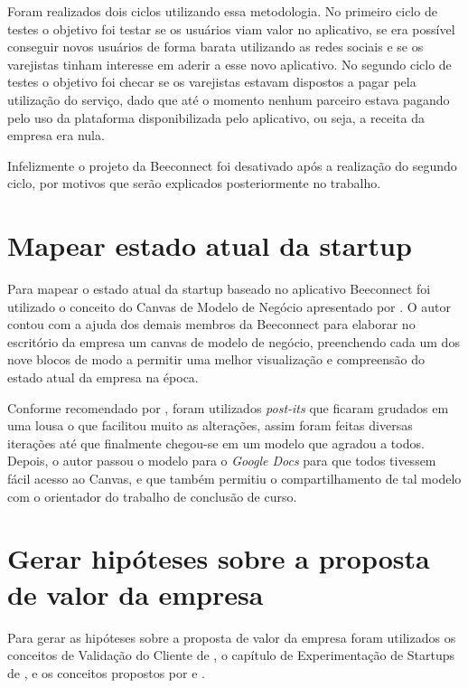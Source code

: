 Foram realizados dois ciclos utilizando essa metodologia. No primeiro ciclo de testes o objetivo foi testar se os usuários viam valor no aplicativo, se era possível conseguir novos usuários de forma barata utilizando as redes sociais e se os varejistas tinham interesse em aderir a esse novo aplicativo. No segundo ciclo de testes o objetivo foi checar se os varejistas estavam dispostos a pagar pela utilização do serviço, dado que até o momento nenhum parceiro estava pagando pelo uso da plataforma disponibilizada pelo aplicativo, ou seja, a receita da empresa era nula.

Infelizmente o projeto da Beeconnect foi desativado após a realização do segundo ciclo, por motivos que serão explicados posteriormente no trabalho.

\section{Mapear estado atual da startup}
\label{cha:mapear_estado}
Para mapear o estado atual da startup baseado no aplicativo Beeconnect foi utilizado o conceito do Canvas de Modelo de Negócio apresentado por .
O autor contou com a ajuda dos demais membros da Beeconnect para elaborar no escritório da empresa um canvas de modelo de negócio, preenchendo cada um dos nove blocos de modo a permitir uma melhor visualização e compreensão do estado atual da empresa na época. 

Conforme recomendado por  , foram utilizados \textit{post-its} que ficaram grudados em uma lousa o que facilitou muito as alterações, assim foram feitas diversas iterações até que finalmente chegou-se em um modelo que agradou a todos. Depois, o autor passou o modelo para o \textit{Google Docs} para que todos tivessem fácil acesso ao Canvas, e que também permitiu o compartilhamento de tal modelo com o orientador do trabalho de conclusão de curso.

\section{Gerar hipóteses sobre a proposta de valor da empresa}
\label{cha:gerar_hipoteses}
Para gerar as hipóteses sobre a proposta de valor da empresa foram utilizados os conceitos de Validação do Cliente de , o capítulo de Experimentação de Startups de , e os conceitos propostos por  e .    


